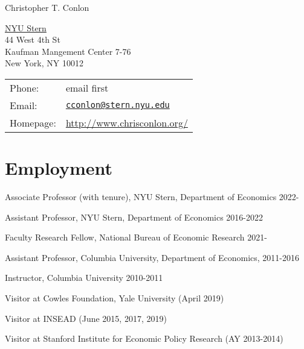 \documentclass[letterpaper]{article}
\def\name{Christopher T. Conlon}
\renewenvironment{itemize}{
  \begin{list}{}{
    \setlength{\leftmargin}{1.5em}
  }
}{
  \end{list}
}
\begin{document}
{\huge \name}


\vspace{0.25in}

\begin{minipage}{0.45\linewidth}
  \href{http://www.chrisconlon.org/}{NYU Stern} \\
  44 West 4th St \\
  Kaufman Mangement Center 7-76 \\
  New York, NY 10012
\end{minipage}
\begin{minipage}{0.45\linewidth}
  \begin{tabular}{ll}
    Phone: & email first \\
     Email: & \href{mailto:cconlon@stern.nyu.edu}{\tt cconlon@stern.nyu.edu} \\
    Homepage: & \url{http://www.chrisconlon.org/} \\
  \end{tabular}
\end{minipage}

\section*{Employment}

\begin{itemize}
\item Associate Professor (with tenure), NYU Stern, Department of Economics 2022-
\item Assistant Professor, NYU Stern, Department of Economics 2016-2022
\item Faculty Research Fellow, National Bureau of Economic Research 2021-
\item Assistant Professor, Columbia University, Department of Economics, 2011-2016
\item Instructor, Columbia University 2010-2011
\item Visitor at Cowles Foundation, Yale University (April 2019)
\item Visitor at INSEAD (June 2015, 2017, 2019)
\item Visitor at Stanford Institute for Economic Policy Research (AY 2013-2014)
\end{itemize}
\end{document}
